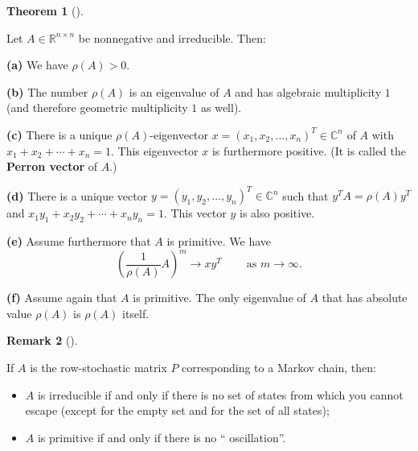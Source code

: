 \documentclass[numbers=enddot,12pt,final,onecolumn,notitlepage]{scrartcl}%
\numberwithin{exer}{subsection}
\theoremstyle{definition}
\newtheorem{theo}{Theorem}[subsection]
\newenvironment{theorem}[1][]
{\begin{theo}[#1]\begin{leftbar}}
{\end{leftbar}\end{theo}}
\newtheorem{remk}[theo]{Remark}
\newenvironment{remark}[1][]
{\begin{remk}[#1]\begin{leftbar}}
{\end{leftbar}\end{remk}}
\begin{document}
\begin{theorem}
[Perron--Frobenius 2]Let $A\in\mathbb{R}^{n\times n}$ be nonnegative and
irreducible. Then:

\textbf{(a)} We have $\rho\left(  A\right)  >0$.

\textbf{(b)} The number $\rho\left(  A\right)  $ is an eigenvalue of $A$ and
has algebraic multiplicity $1$ (and therefore geometric multiplicity $1$ as well).

\textbf{(c)} There is a unique $\rho\left(  A\right)  $-eigenvector $x=\left(
x_{1},x_{2},\ldots,x_{n}\right)  ^{T}\in\mathbb{C}^{n}$ of $A$ with
$x_{1}+x_{2}+\cdots+x_{n}=1$. This eigenvector $x$ is furthermore positive.
(It is called the \textbf{Perron vector} of $A$.)

\textbf{(d)} There is a unique vector $y=\left(  y_{1},y_{2},\ldots
,y_{n}\right)  ^{T}\in\mathbb{C}^{n}$ such that $y^{T}A=\rho\left(  A\right)
y^{T}$ and $x_{1}y_{1}+x_{2}y_{2}+\cdots+x_{n}y_{n}=1$. This vector $y$ is
also positive.

\textbf{(e)} Assume furthermore that $A$ is primitive. We have%
\[
\left(  \dfrac{1}{\rho\left(  A\right)  }A\right)  ^{m}\rightarrow
xy^{T}\ \ \ \ \ \ \ \ \ \ \text{as }m\rightarrow\infty.
\]


\textbf{(f)} Assume again that $A$ is primitive. The only eigenvalue of $A$
that has absolute value $\rho\left(  A\right)  $ is $\rho\left(  A\right)  $ itself.
\end{theorem}

\begin{remark}
If $A$ is the row-stochastic matrix $P$ corresponding to a Markov chain, then:

\begin{itemize}
\item $A$ is irreducible if and only if there is no set of states from which
you cannot escape (except for the empty set and for the set of all states);

\item $A$ is primitive if and only if there is no \textquotedblleft
oscillation\textquotedblright.
\end{itemize}
\end{remark}
\end{document}
